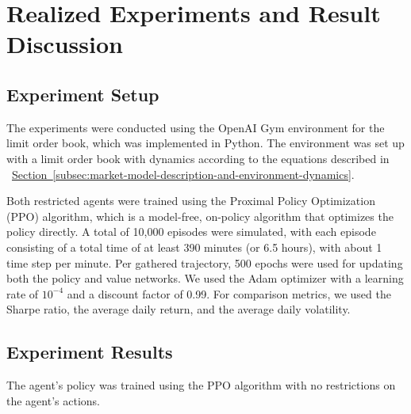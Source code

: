\section{Realized Experiments and Result Discussion}
\label{sec:realized-experiments-and-result-discussion}

\subsection{Experiment Setup}
\label{subsec:experiment-setup}

The experiments were conducted using the OpenAI Gym environment for the limit order book, which was implemented in Python.
The environment was set up with a limit order book with dynamics according to the equations described in
~\hyperref[subsec:market-model-description-and-environment-dynamics]{Section~\ref*{subsec:market-model-description-and-environment-dynamics}}.

Both restricted agents were trained using the Proximal Policy Optimization (PPO) algorithm, which is a model-free, on-policy algorithm that optimizes the policy directly.
A total of 10,000 episodes were simulated, with each episode consisting of a total time of at least 390 minutes (or 6.5 hours), with about 1 time step per minute.
Per gathered trajectory, 500 epochs were used for updating both the policy and value networks.
We used the Adam optimizer with a learning rate of $10^{-4}$ and a discount factor of 0.99.
For comparison metrics, we used the Sharpe ratio, the average daily return, and the average daily volatility.

\subsection{Experiment Results}

The agent's policy was trained using the PPO algorithm with no restrictions on the agent's actions.
